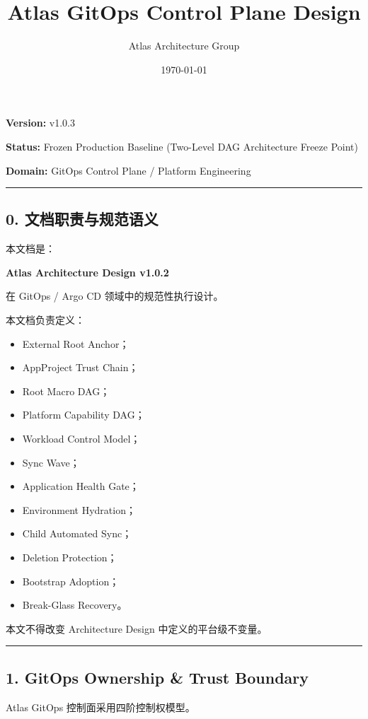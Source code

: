 \documentclass[11pt,a4paper]{article}
\title{\textbf{\Large Atlas GitOps Control Plane Design}}
\author{Atlas Architecture Group}
\date{\today}
\begin{document}
\maketitle
\tableofcontents
\newpage

\textbf{Version:} v1.0.3

\textbf{Status:} Frozen Production Baseline (Two-Level DAG Architecture Freeze Point)

\textbf{Domain:} GitOps Control Plane / Platform Engineering

\vspace{0.5em}\hrule\vspace{0.5em}
\subsection{0. 文档职责与规范语义}
本文档是：

\begin{gfmBlockquote}
\textbf{Atlas Architecture Design v1.0.2}
\end{gfmBlockquote}
在 GitOps / Argo CD 领域中的规范性执行设计。

本文档负责定义：

\begin{itemize}
  \item External Root Anchor；
  \item AppProject Trust Chain；
  \item Root Macro DAG；
  \item Platform Capability DAG；
  \item Workload Control Model；
  \item Sync Wave；
  \item Application Health Gate；
  \item Environment Hydration；
  \item Child Automated Sync；
  \item Deletion Protection；
  \item Bootstrap Adoption；
  \item Break-Glass Recovery。
\end{itemize}
本文不得改变 Architecture Design 中定义的平台级不变量。

\vspace{0.5em}\hrule\vspace{0.5em}
\subsection{1. GitOps Ownership \& Trust Boundary}
Atlas GitOps 控制面采用四阶控制权模型。
\end{document}
